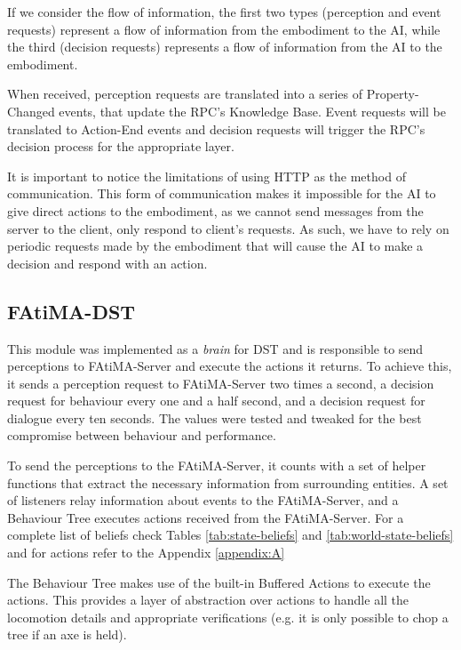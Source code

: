 If we consider the flow of information, the first two types (perception and event requests) represent a flow of information from the embodiment to the \ac{AI}, while the third (decision requests) represents a flow of information from the \ac{AI} to the embodiment.

When received, perception requests are translated into a series of Property-Changed events, that update the \ac{RPC}'s Knowledge Base.
Event requests will be translated to Action-End events and decision requests will trigger the \ac{RPC}'s decision process for the appropriate layer.

It is important to notice the limitations of using \ac{HTTP} as the method of communication.
This form of communication makes it impossible for the \ac{AI} to give direct actions to the embodiment, as we cannot send messages from the server to the client, only respond to client's requests.
As such, we have to rely on periodic requests made by the embodiment that will cause the \ac{AI} to make a decision and respond with an action.

\subsection{FAtiMA-DST}

\noindent This module was implemented as a \textit{brain} for \ac{DST} and is responsible to send perceptions to FAtiMA-Server and execute the actions it returns.
To achieve this, it sends a perception request to FAtiMA-Server two times a second, a decision request for behaviour every one and a half second, and a decision request for dialogue every ten seconds.
The values were tested and tweaked for the best compromise between behaviour and performance.

To send the perceptions to the FAtiMA-Server, it counts with a set of helper functions that extract the necessary information from surrounding entities.
A set of listeners relay information about events to the FAtiMA-Server, and a Behaviour Tree executes actions received from the FAtiMA-Server.
For a complete list of beliefs check Tables \ref{tab:state-beliefs} and \ref{tab:world-state-beliefs} and for actions refer to the Appendix \ref{appendix:A}

The Behaviour Tree makes use of the built-in Buffered Actions to execute the actions.
This provides a layer of abstraction over actions to handle all the locomotion details and appropriate verifications (e.g. it is only possible to chop a tree if an axe is held).

